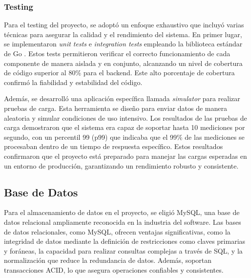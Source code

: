 \subsubsection{Testing}
Para el testing del proyecto, se adoptó un enfoque exhaustivo que incluyó varias técnicas para asegurar la calidad y el rendimiento del sistema. En primer lugar, se implementaron \textit{unit tests} e \textit{integration tests} empleando la biblioteca estándar de Go \cite{GoStdlibTesting}. Estos tests permitieron verificar el correcto funcionamiento de cada componente de manera aislada y en conjunto, alcanzando un nivel de cobertura de código superior al 80\% para el backend. Este alto porcentaje de cobertura confirmó la fiabilidad y estabilidad del código.

Además, se desarrolló una aplicación específica llamada \textit{simulator} para realizar pruebas de carga. Esta herramienta se diseño para enviar datos de manera aleatoria y simular condiciones de uso intensivo. Los resultados de las pruebas de carga demostraron que el sistema era capaz de soportar hasta 10 mediciones por segundo, con un percentil 99 (p99) que indicaba que el 99\% de las mediciones se procesaban dentro de un tiempo de respuesta específico. Estos resultados confirmaron que el proyecto está preparado para manejar las cargas esperadas en un entorno de producción, garantizando un rendimiento robusto y consistente.




\subsection{Base de Datos}

Para el almacenamiento de datos en el proyecto, se eligió MySQL, una base de datos relacional ampliamente reconocida en la industria del software. Las bases de datos relacionales, como MySQL, ofrecen ventajas significativas, como la integridad de datos mediante la definición de restricciones como claves primarias y foráneas, la capacidad para realizar consultas complejas a través de SQL, y la normalización que reduce la redundancia de datos. Además, soportan transacciones ACID, lo que asegura operaciones confiables y consistentes.

